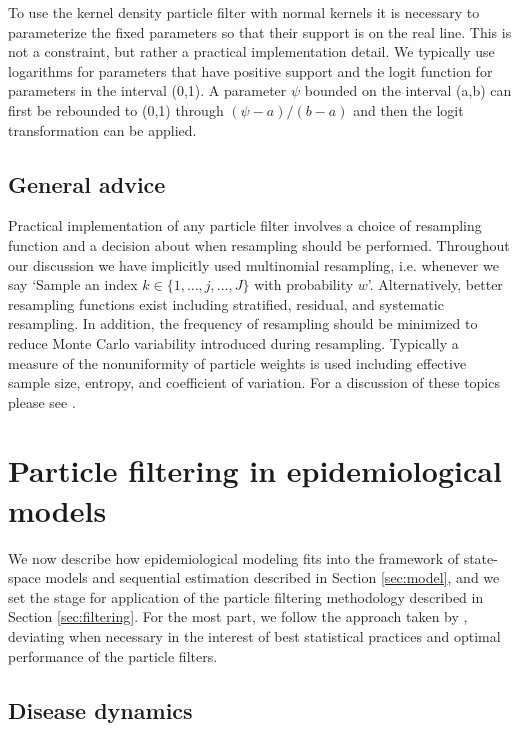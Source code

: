 \documentclass{elsarticle}
\begin{document}
To use the kernel density particle filter with normal kernels it is necessary to parameterize the fixed parameters so that their support is on the real line. This is not a constraint, but rather a practical implementation detail. We typically use logarithms for parameters that have positive support and the logit function for parameters in the interval (0,1). A parameter $\psi$ bounded on the interval (a,b) can first be rebounded to (0,1) through $(\psi-a)/(b-a)$ and then the logit transformation can be applied.

\subsection{General advice}

Practical implementation of any particle filter involves a choice of resampling function and a decision about when resampling should be performed. Throughout our discussion we have implicitly used multinomial resampling, i.e. whenever we say `Sample an index $k\in\{1,\ldots,j,\ldots,J\}$ with probability $w$'. Alternatively, better resampling functions exist including stratified, residual, and systematic resampling. In addition, the frequency of resampling should be minimized to reduce Monte Carlo variability introduced during resampling. Typically a measure of the nonuniformity of particle weights is used including effective sample size, entropy, and coefficient of variation. For a discussion of these topics please see \cite{Douc:Capp:Moul:comp:2005}.

\section{Particle filtering in epidemiological models \label{sec:apply}}

We now describe how epidemiological modeling fits into the framework of state-space models and sequential estimation described in Section \ref{sec:model}, and we set the stage for application of the particle filtering methodology described in Section \ref{sec:filtering}.  For the most part, we follow the approach taken by \citet{skvortsov2012monitoring}, deviating when necessary in the interest of best statistical practices and optimal performance of the particle filters.

\subsection{Disease dynamics} \label{sec:dd}
\end{document}
